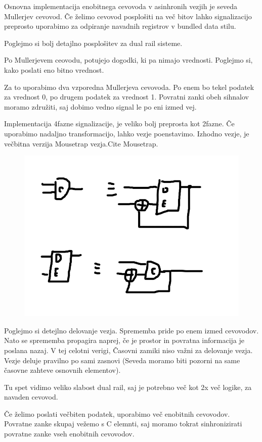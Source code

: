 Osnovna implementacija enobitnega cevovoda v asinhronih vezjih je seveda Mullerjev cevovod. Če želimo cevovod posplošiti na več bitov lahko signalizacijo preprosto uporabimo za odpiranje navadnih registrov v bundled data stilu. 

Poglejmo si bolj detajlno posplošitev za dual rail sisteme.

Po Mullerjevem ceovodu, potujejo dogodki, ki pa nimajo vrednosti. Poglejmo si, kako poslati eno bitno vrednost.

Za to uporabimo dva vzporedna Mullerjeva cevovoda. Po enem bo tekel podatek za vrednost 0, po drugem podatek za vrednost 1. Povratni zanki obeh sihnalov moramo združiti, saj dobimo vedno signal le po eni izmed vej.

Implementacija 4fazne signalizacije, je veliko bolj preprosta kot 2fazne. Če uporabimo nadaljno transformacijo, lahko vezje poenstavimo. Izhodno vezje, je večbitna verzija Mousetrap vezja.Cite Mousetrap.

\begin{figure}
	\centering
	\includegraphics[width=0.7\linewidth]{slike/CtoD}
	\caption{}
	\label{fig:celement}
\end{figure}

Poglejmo si detejlno delovanje vezja. Sprememba pride po enem izmed cevovodov. Nato se sprememba propagira naprej, če je prostor in povratna informacija je poslana nazaj. V tej celotni verigi, Časovni zamiki niso važni za delovanje vezja. Vezje deluje pravilno po sami zasnovi (Seveda moramo biti pozorni na same časovne zahteve osnovnih elementov).

Tu spet vidimo veliko slabost dual rail, saj je potrebno več kot 2x več logike, za navaden cevovod.

Če želimo poslati večbiten podatek, uporabimo več enobitnih cevovodov. Povratne zanke skupaj vežemo s C elemnti, saj moramo tokrat sinhronizirati povratne zanke vseh enobitnih cevovodov.


